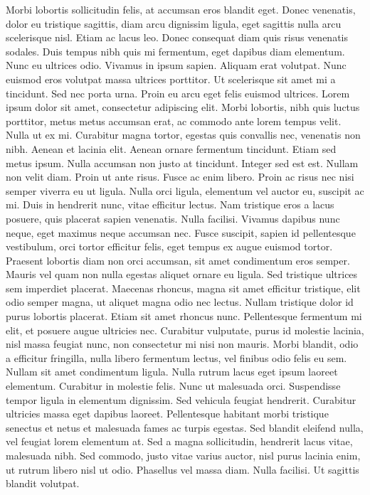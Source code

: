 {Morbi lobortis sollicitudin felis, at accumsan eros blandit eget. Donec venenatis, dolor eu tristique sagittis, diam arcu dignissim ligula, eget sagittis nulla arcu scelerisque nisl. Etiam ac lacus leo. Donec consequat diam quis risus venenatis sodales. Duis tempus nibh quis mi fermentum, eget dapibus diam elementum. Nunc eu ultrices odio. Vivamus in ipsum sapien. Aliquam erat volutpat. Nunc euismod eros volutpat massa ultrices porttitor. Ut scelerisque sit amet mi a tincidunt. Sed nec porta urna. Proin eu arcu eget felis euismod ultrices. Lorem ipsum dolor sit amet, consectetur adipiscing elit. Morbi lobortis, nibh quis luctus porttitor, metus metus accumsan erat, ac commodo ante lorem tempus velit. Nulla ut ex mi. Curabitur magna tortor, egestas quis convallis nec, venenatis non nibh. Aenean et lacinia elit. Aenean ornare fermentum tincidunt. Etiam sed metus ipsum. Nulla accumsan non justo at tincidunt. Integer sed est est. Nullam non velit diam. Proin ut ante risus. Fusce ac enim libero. Proin ac risus nec nisi semper viverra eu ut ligula. Nulla orci ligula, elementum vel auctor eu, suscipit ac mi. Duis in hendrerit nunc, vitae efficitur lectus. Nam tristique eros a lacus posuere, quis placerat sapien venenatis.
Nulla facilisi. Vivamus dapibus nunc neque, eget maximus neque accumsan nec. Fusce suscipit, sapien id pellentesque vestibulum, orci tortor efficitur felis, eget tempus ex augue euismod tortor. Praesent lobortis diam non orci accumsan, sit amet condimentum eros semper. Mauris vel quam non nulla egestas aliquet ornare eu ligula. Sed tristique ultrices sem imperdiet placerat. Maecenas rhoncus, magna sit amet efficitur tristique, elit odio semper magna, ut aliquet magna odio nec lectus. Nullam tristique dolor id purus lobortis placerat.
Etiam sit amet rhoncus nunc. Pellentesque fermentum mi elit, et posuere augue ultricies nec. Curabitur vulputate, purus id molestie lacinia, nisl massa feugiat nunc, non consectetur mi nisi non mauris. Morbi blandit, odio a efficitur fringilla, nulla libero fermentum lectus, vel finibus odio felis eu sem. Nullam sit amet condimentum ligula. Nulla rutrum lacus eget ipsum laoreet elementum. Curabitur in molestie felis. Nunc ut malesuada orci.
Suspendisse tempor ligula in elementum dignissim. Sed vehicula feugiat hendrerit. Curabitur ultricies massa eget dapibus laoreet. Pellentesque habitant morbi tristique senectus et netus et malesuada fames ac turpis egestas. Sed blandit eleifend nulla, vel feugiat lorem elementum at. Sed a magna sollicitudin, hendrerit lacus vitae, malesuada nibh. Sed commodo, justo vitae varius auctor, nisl purus lacinia enim, ut rutrum libero nisl ut odio. Phasellus vel massa diam. Nulla facilisi. Ut sagittis blandit volutpat.
}
